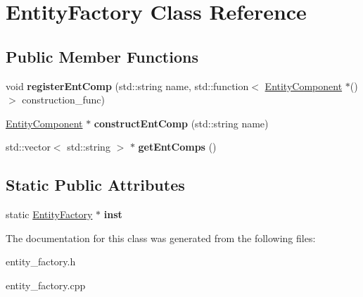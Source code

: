 \hypertarget{class_entity_factory}{}\section{Entity\+Factory Class Reference}
\label{class_entity_factory}
\subsection*{Public Member Functions}
\begin{DoxyCompactItemize}
\item 
\mbox{\label{class_entity_factory_a8d71e5cc38b588731169c475778ab21f}} 
void {\bfseries register\+Ent\+Comp} (std\+::string name, std\+::function$<$ \hyperlink{class_entity_component}{Entity\+Component} $\ast$()$>$ construction\+\_\+func)
\item 
\mbox{\label{class_entity_factory_a2ab1d07653d50c80a77114566a9c19c7}} 
\hyperlink{class_entity_component}{Entity\+Component} $\ast$ {\bfseries construct\+Ent\+Comp} (std\+::string name)
\item 
\mbox{\label{class_entity_factory_ac516b734bae6d5a15c8b491bc7e80ae7}} 
std\+::vector$<$ std\+::string $>$ $\ast$ {\bfseries get\+Ent\+Comps} ()
\end{DoxyCompactItemize}
\subsection*{Static Public Attributes}
\begin{DoxyCompactItemize}
\item 
\mbox{\label{class_entity_factory_a5e193c2faa26b7cfb2ae85074d662749}} 
static \hyperlink{class_entity_factory}{Entity\+Factory} $\ast$ {\bfseries inst}
\end{DoxyCompactItemize}


The documentation for this class was generated from the following files\+:\begin{DoxyCompactItemize}
\item 
entity\+\_\+factory.\+h\item 
entity\+\_\+factory.\+cpp\end{DoxyCompactItemize}
